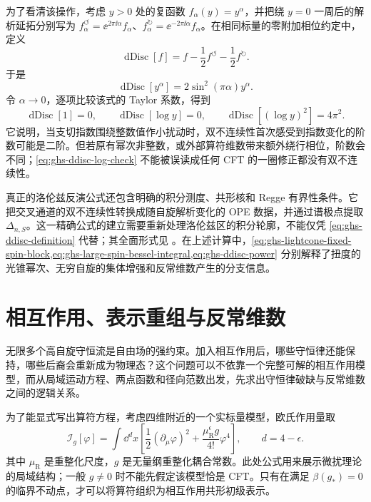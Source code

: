 为了看清该操作，考虑 $y>0$ 处的复函数 $f_\alpha(y)=y^\alpha$，并把绕 $y=0$ 一周后的解析延拓分别写为 $f_\alpha^{\circlearrowleft}=\ee^{2\pi\ii\alpha}f_\alpha$、$f_\alpha^{\circlearrowright}=\ee^{-2\pi\ii\alpha}f_\alpha$。在相同标量的零附加相位约定中，定义
\begin{equation}\label{eq:ghs-ddisc-definition}
 \operatorname{dDisc}[f]
 =f-\frac12f^{\circlearrowleft}-\frac12f^{\circlearrowright}.
\end{equation}
于是
\begin{equation}\label{eq:ghs-ddisc-power}
 \operatorname{dDisc}[y^\alpha]
 =2\sin^2(\pi\alpha)y^\alpha.
\end{equation}
令 $\alpha\to0$，逐项比较该式的 Taylor 系数，得到
\begin{equation}\label{eq:ghs-ddisc-log-check}
 \operatorname{dDisc}[1]=0,\qquad
 \operatorname{dDisc}[\log y]=0,\qquad
 \operatorname{dDisc}[(\log y)^2]=4\pi^2.
\end{equation}
它说明，当支切指数围绕整数值作小扰动时，双不连续性首次感受到指数变化的阶数可能是二阶。但若原有幂次非整数，或外部算符维数带来额外绕行相位，阶数会不同；\cref{eq:ghs-ddisc-log-check} 不能被误读成任何 CFT 的一圈修正都没有双不连续性。

真正的洛伦兹反演公式还包含明确的积分测度、共形核和 Regge 有界性条件。它把交叉通道的双不连续性转换成随自旋解析变化的 OPE 数据，并通过谱极点提取 $\Delta_{n,S}$。这一精确公式的建立需要重新处理洛伦兹区的积分轮廓，不能仅凭 \cref{eq:ghs-ddisc-definition} 代替；其全面形式见 \cite{ghs-caronhuot,ghs-alday-large-spin}。在上述计算中，\cref{eq:ghs-lightcone-fixed-spin-block,eq:ghs-large-spin-bessel-integral,eq:ghs-ddisc-power} 分别解释了扭度的光锥幂次、无穷自旋的集体增强和反常维数产生的分支信息。




\section{相互作用、表示重组与反常维数}
\label{sec:ghs-higher-spin-conservation}


无限多个高自旋守恒流是自由场的强约束。加入相互作用后，哪些守恒律还能保持，哪些后裔会重新成为物理态？这个问题可以不依靠一个完整可解的相互作用模型，而从局域运动方程、两点函数和径向范数出发，先求出守恒律破缺与反常维数之间的逻辑关系。


为了能显式写出算符方程，考虑四维附近的一个实标量模型，欧氏作用量取
\begin{equation}\label{eq:ghs-phi4-action}
 \mathscr I_g[\varphi]=\int\dd^d x\left[
 \frac12(\partial_\mu\varphi)^2
 +\frac{\mu_{\mathrm R}^{\epsilon}g}{4!}\varphi^4\right],
 \qquad d=4-\epsilon.
\end{equation}
其中 $\mu_{\mathrm R}$ 是重整化尺度，$g$ 是无量纲重整化耦合常数。此处公式用来展示微扰理论的局域结构；一般 $g\neq0$ 时不能先假定该模型恰是 CFT。只有在满足 $\beta(g_*)=0$ 的临界不动点，才可以将算符组织为相互作用共形初级表示。


